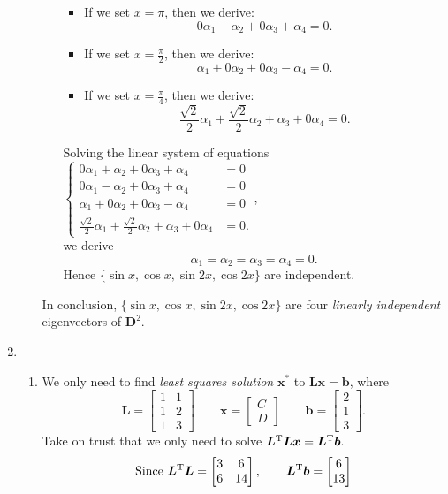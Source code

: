 \begin{enumerate}
\begin{enumerate}
\begin{itemize}
\begin{itemize}
\[\]
\item
If we set $x=\pi$, then we derive:
\[
0\alpha_1-\alpha_2+0\alpha_3+\alpha_4=0.
\]
\item
If we set $x=\frac{\pi}{2}$, then we derive:
\[
\alpha_1+0\alpha_2+0\alpha_3-\alpha_4=0.
\]
\item
If we set $x=\frac{\pi}{4}$, then we derive:
\[
\frac{\sqrt{2}}{2}\alpha_1+\frac{\sqrt{2}}{2}\alpha_2+\alpha_3+0\alpha_4=0.
\]
\end{itemize}
Solving the linear system of equations $\left\{\begin{aligned}
0\alpha_1+\alpha_2+0\alpha_3+\alpha_4&=0\\
0\alpha_1-\alpha_2+0\alpha_3+\alpha_4&=0\\
\alpha_1+0\alpha_2+0\alpha_3-\alpha_4&=0\\
\frac{\sqrt{2}}{2}\alpha_1+\frac{\sqrt{2}}{2}\alpha_2+\alpha_3+0\alpha_4&=0.
\end{aligned}\right.$,\\ we derive
\[
\alpha_1=\alpha_2=\alpha_3=\alpha_4=0.
\]
Hence $\{\sin x,\cos x,\sin 2x,\cos 2x\}$ are independent.
\end{itemize}
In conclusion, $\{\sin x,\cos x,\sin 2x,\cos 2x\}$ are four \textit{linearly independent} eigenvectors of $\bm D^2.$
\end{enumerate}
\item
\begin{enumerate}
\item
We only need to find \textit{least squares solution} $\bm x^*$ to $\bm{Lx}=\bm b$, where 
\[
\bm L=\begin{bmatrix}
1&1\\
1&2\\
1&3
\end{bmatrix}\qquad
\bm x=\begin{bmatrix}
C\\D
\end{bmatrix}\qquad
\bm b=\begin{bmatrix}
2\\1\\3
\end{bmatrix}.
\]
Take on trust that we only need to solve $\bm L^{\mathrm T}\bm L\bm x=\bm L^{\mathrm T}\bm b.$
\[
\text{Since }\bm L^{\mathrm T}\bm L=\begin{bmatrix}
3&6\\6&14
\end{bmatrix},\qquad
\bm L^{\mathrm T}\bm b=\begin{bmatrix}
6\\13

\end{bmatrix}\]
\end{enumerate}
\end{enumerate}
